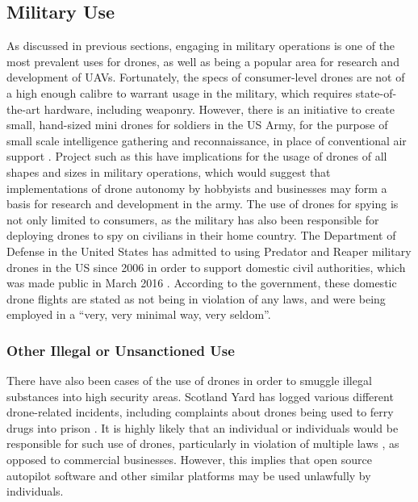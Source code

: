 \subsection{Military Use}
As discussed in previous sections, engaging in military operations is one of the most prevalent uses for drones, as well as being a popular area for research and development of UAVs. Fortunately, the specs of consumer-level drones are not of a high enough calibre to warrant usage in the military, which requires state-of-the-art hardware, including weaponry. However, there is an initiative to create small, hand-sized mini drones for soldiers in the US Army, for the purpose of small scale intelligence gathering and reconnaissance, in place of conventional air support \cite{jonfingas2016}. Project such as this have implications for the usage of drones of all shapes and sizes in military operations, which would suggest that implementations of drone autonomy by hobbyists and businesses may form a basis for research and development in the army.
The use of drones for spying is not only limited to consumers, as the military has also been responsible for deploying drones to spy on civilians in their home country. The Department of Defense in the United States has admitted to using Predator and Reaper military drones in the US since 2006 in order to support domestic civil authorities, which was made public in March 2016 \cite{pentagon2016}. According to the government, these domestic drone flights are stated as not being in violation of any laws, and were being employed in a “very, very minimal way, very seldom”.

\subsubsection{Other Illegal or Unsanctioned Use}
There have also been cases of the use of drones in order to smuggle illegal substances into high security areas. Scotland Yard has logged various different drone-related incidents, including complaints about drones being used to ferry drugs into prison \cite{maryannrusson2015}.  It is highly likely that an individual or individuals would be responsible for such use of drones, particularly in violation of multiple laws \cite{civilaviationauthority2015}, as opposed to commercial businesses. However, this implies that open source autopilot software and other similar platforms may be used unlawfully by individuals.
